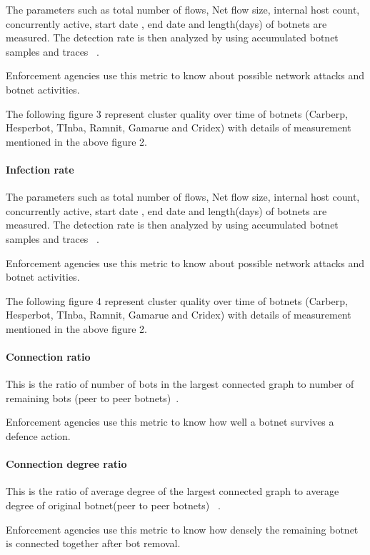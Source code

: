 The  parameters such as total number of flows, Net flow size, internal host count, concurrently  active, start date , end date and length(days) of botnets are measured. The detection rate is then analyzed by using accumulated botnet samples and traces ~\cite{haltas2014automated}.

Enforcement agencies use this metric to know about possible network attacks and botnet activities. 

The following  figure 3 represent  cluster quality over time of botnets (Carberp, Hesperbot, TInba, Ramnit, Gamarue and Cridex) with details of measurement mentioned in the above figure 2.

\paragraph{ Infection rate }

The  parameters such as total number of flows, Net flow size, internal host count, concurrently  active, start date , end date and length(days) of botnets are measured. The detection rate is then analyzed by using accumulated botnet samples and traces ~\cite{haltas2014automated}.

Enforcement agencies use this metric to know about possible network attacks and botnet activities. 

The following  figure 4 represent  cluster quality over time of botnets (Carberp, Hesperbot, TInba, Ramnit, Gamarue and Cridex) with details of measurement mentioned in the above figure 2.

\paragraph{ Connection ratio }

This is the ratio of number of bots in the largest connected graph to number of remaining bots (peer to peer botnets)~\cite{ wang2010peer}.

Enforcement agencies use this metric to know how well a botnet survives a defence action.

\paragraph{ Connection degree ratio }

This is the ratio of average degree of the largest connected graph to average degree of original botnet(peer to peer botnets) ~\cite{wang2010peer}.

Enforcement agencies use this metric to know how densely the remaining botnet is connected together after bot removal.

